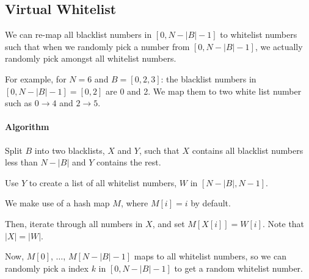 \subsection{Virtual Whitelist}
We can re-map all blacklist numbers in $[0,N−\lvert B\rvert-1]$ to whitelist numbers such that when we randomly pick a number from $[0,N−\lvert B\rvert-1]$, we actually randomly pick amongst all whitelist numbers.

For example, for $N=6$ and $B=[0,2,3]$: the blacklist numbers in $[0,N−\lvert B\rvert-1] = [0, 2]$ are 0 and 2. We map them to two white list number such as $0\to 4$ and $2\to 5$.

\paragraph{Algorithm} 

Split $B$ into two blacklists, $X$ and $Y$, such that $X$ contains all blacklist numbers less than $N−\lvert B\rvert$ and $Y$ contains the rest.

Use $Y$ to create a list of all whitelist numbers, $W$ in $[N−\lvert B\rvert, N-1]$.

We make use of a hash map $M$, where $M[i]=i$ by default.

Then, iterate through all numbers in $X$, and set $M[X[i]]=W[i]$. Note that $\lvert X\rvert=\rvert W\lvert$.

Now, $M[0]$, $\ldots$, $M[N−\lvert B\rvert−1]$ maps to all whitelist numbers, so we can randomly pick a index $k$ in $[0,N-\lvert B\rvert-1]$ to get a random whitelist number.


